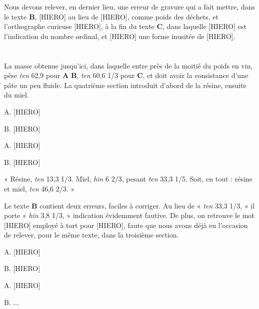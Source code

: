 \documentclass[a4paper, 11pt, oneside, landscape]{article}
\begin{document}
Nous devons relever, en dernier lieu, une erreur de gravure qui a fait mettre, dans le texte \textbf{B}, [HIERO] au lieu de [HIERO], comme poids des déchets, et l'orthographe curieuse [HIERO], à la fin du texte \textbf{C}, dans laquelle [HIERO] est l'indication du nombre ordinal, et [HIERO] une forme inusitée de [HIERO].
\clearpage
\section{}
\paragraph{}
La masse obtenue jusqu'ici, dans laquelle entre près de la moitié du poids en vin, pèse \emph{ten} 62,9 pour \textbf{A} \textbf{B}, \emph{ten} 60,6 1/3 pour \textbf{C}, et doit avoir la consistance d'une pâte un peu fluide. La quatrième section introduit d'abord de la résine, ensuite du miel.

A. [HIERO]

B. [HIERO]

A. [HIERO]

B. [HIERO]

« Résine, \emph{ten} 13,3 1/3. Miel, \emph{hin} 6 2/3, pesant \emph{ten} 33,3 1/5. Soit, en tout : résine et miel, \emph{ten} 46,6 2/3. »

Le texte \textbf{B} contient deux erreurs, faciles à corriger. Au lieu de « \emph{ten} 33,3 1/3, » il porte « \emph{hin} 3,8 1/3, » indication évidemment fautive. De plus, on retrouve le mot [HIERO] employé à tort pour [HIERO], faute que nous avons déjà eu l'occasion de relever, pour le même texte, dans la troisième section.

A. [HIERO]

B. [HIERO]

A. [HIERO]

B. ...
\end{document}

